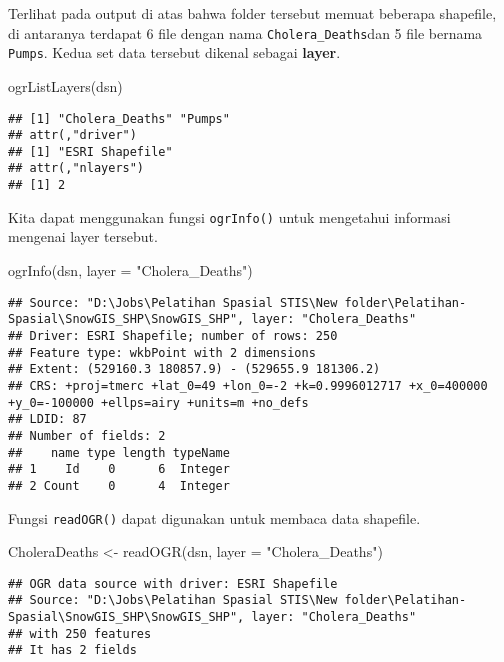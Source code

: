 \documentclass[
]{book}
\newenvironment{Shaded}{\begin{snugshade}}{\end{snugshade}}
\newcommand{\AttributeTok}[1]{\textcolor[rgb]{0.77,0.63,0.00}{#1}}
\newcommand{\FunctionTok}[1]{\textcolor[rgb]{0.00,0.00,0.00}{#1}}
\newcommand{\NormalTok}[1]{#1}
\newcommand{\OtherTok}[1]{\textcolor[rgb]{0.56,0.35,0.01}{#1}}
\newcommand{\StringTok}[1]{\textcolor[rgb]{0.31,0.60,0.02}{#1}}
\begin{document}
Terlihat pada output di atas bahwa folder tersebut memuat beberapa shapefile, di antaranya terdapat 6 file dengan nama \texttt{Cholera\_Deaths}dan 5 file bernama \texttt{Pumps}. Kedua set data tersebut dikenal sebagai \textbf{layer}.

\begin{Shaded}
\begin{Highlighting}[]
\FunctionTok{ogrListLayers}\NormalTok{(dsn)}
\end{Highlighting}
\end{Shaded}

\begin{verbatim}
## [1] "Cholera_Deaths" "Pumps"         
## attr(,"driver")
## [1] "ESRI Shapefile"
## attr(,"nlayers")
## [1] 2
\end{verbatim}

Kita dapat menggunakan fungsi \texttt{ogrInfo()} untuk mengetahui informasi mengenai layer tersebut.

\begin{Shaded}
\begin{Highlighting}[]
\FunctionTok{ogrInfo}\NormalTok{(dsn, }\AttributeTok{layer =} \StringTok{"Cholera\_Deaths"}\NormalTok{)}
\end{Highlighting}
\end{Shaded}

\begin{verbatim}
## Source: "D:\Jobs\Pelatihan Spasial STIS\New folder\Pelatihan-Spasial\SnowGIS_SHP\SnowGIS_SHP", layer: "Cholera_Deaths"
## Driver: ESRI Shapefile; number of rows: 250 
## Feature type: wkbPoint with 2 dimensions
## Extent: (529160.3 180857.9) - (529655.9 181306.2)
## CRS: +proj=tmerc +lat_0=49 +lon_0=-2 +k=0.9996012717 +x_0=400000 +y_0=-100000 +ellps=airy +units=m +no_defs 
## LDID: 87 
## Number of fields: 2 
##    name type length typeName
## 1    Id    0      6  Integer
## 2 Count    0      4  Integer
\end{verbatim}

Fungsi \texttt{readOGR()} dapat digunakan untuk membaca data shapefile.

\begin{Shaded}
\begin{Highlighting}[]
\NormalTok{CholeraDeaths }\OtherTok{\textless{}{-}} \FunctionTok{readOGR}\NormalTok{(dsn, }\AttributeTok{layer =} \StringTok{"Cholera\_Deaths"}\NormalTok{)}
\end{Highlighting}
\end{Shaded}

\begin{verbatim}
## OGR data source with driver: ESRI Shapefile 
## Source: "D:\Jobs\Pelatihan Spasial STIS\New folder\Pelatihan-Spasial\SnowGIS_SHP\SnowGIS_SHP", layer: "Cholera_Deaths"
## with 250 features
## It has 2 fields
\end{verbatim}
\end{document}
